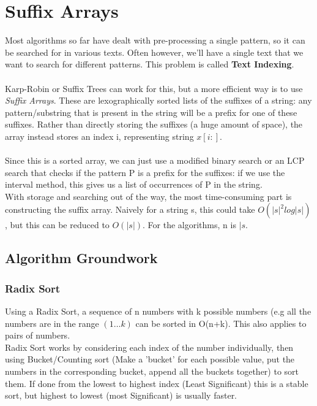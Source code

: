 \section{Suffix Arrays}
Most algorithms so far have dealt with pre-processing a single pattern, so it can be searched for in various texts. Often however, we'll have a single text that we want to search for different patterns. This problem is called \textbf{Text Indexing}.\\ \\
Karp-Robin or Suffix Trees can work for this, but a more efficient way is to use \emph{Suffix Arrays}. These are lexographically sorted lists of the suffixes of a string: any pattern/substring that is present in the string will be a prefix for one of these suffixes. Rather than directly storing the suffixes (a huge amount of space), the array instead stores an index i, representing string $x[i:]$. \\ \\
Since this is a sorted array, we can just use a modified binary search or an LCP search that checks if the pattern P is a prefix for the suffixes: if we use the interval method, this gives us a list of occurrences of P in the string. \\
With storage and searching out of the way, the most time-consuming part is constructing the suffix array. Naively for a string s, this could take $O(|s|^2log|s|)$, but this can be reduced to $O(|s|)$.  For the algorithms, n is $|s$.

\subsection{Algorithm Groundwork}

\subsubsection{Radix Sort}
Using a Radix Sort, a sequence of n numbers with k possible numbers (e.g all the numbers are in the range $(1\dots k)$ can be sorted in O(n+k). This also applies to pairs of numbers.\\
Radix Sort works by considering each index of the number individually, then using Bucket/Counting sort (Make a 'bucket' for each possible value, put the numbers in the corresponding bucket, append all the buckets together) to sort them. If done from the lowest to highest index (Least Significant) this is a stable sort, but highest to lowest (most Significant) is usually faster. 

